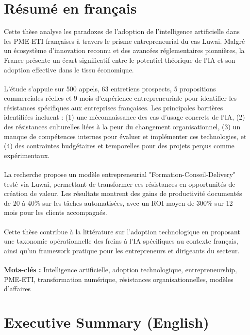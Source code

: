 \section*{Résumé en français}

Cette thèse analyse les paradoxes de l'adoption de l'intelligence artificielle dans les PME-ETI françaises à travers le prisme entrepreneurial du cas Luwai. Malgré un écosystème d'innovation reconnu et des avancées réglementaires pionnières, la France présente un écart significatif entre le potentiel théorique de l'IA et son adoption effective dans le tissu économique.
\\\\
L'étude s'appuie sur 500 appels, 63 entretiens prospects, 5 propositions commerciales réelles et 9 mois d'expérience entrepreneuriale pour identifier les résistances spécifiques aux entreprises françaises. Les principales barrières identifiées incluent : (1) une méconnaissance des cas d'usage concrets de l'IA, (2) des résistances culturelles liées à la peur du changement organisationnel, (3) un manque de compétences internes pour évaluer et implémenter ces technologies, et (4) des contraintes budgétaires et temporelles pour des projets perçus comme expérimentaux.
\\\\
La recherche propose un modèle entrepreneurial "Formation-Conseil-Delivery" testé via Luwai, permettant de transformer ces résistances en opportunités de création de valeur. Les résultats montrent des gains de productivité documentés de 20 à 40\% sur les tâches automatisées, avec un ROI moyen de 300\% sur 12 mois pour les clients accompagnés.
\\\\
Cette thèse contribue à la littérature sur l'adoption technologique en proposant une taxonomie opérationnelle des freins à l'IA spécifiques au contexte français, ainsi qu'un framework pratique pour les entrepreneurs et dirigeants du secteur.
\\\\
\textbf{Mots-clés :} Intelligence artificielle, adoption technologique, entrepreneurship, PME-ETI, transformation numérique, résistances organisationnelles, modèles d'affaires

\newpage
\section*{Executive Summary (English)}

